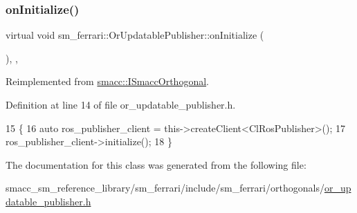 \subsubsection{\texorpdfstring{on\+Initialize()}{onInitialize()}}
{\footnotesize\ttfamily virtual void sm\+\_\+ferrari\+::\+Or\+Updatable\+Publisher\+::on\+Initialize (\begin{DoxyParamCaption}{ }\end{DoxyParamCaption})\hspace{0.3cm}{\ttfamily [inline]}, {\ttfamily [override]}, {\ttfamily [virtual]}}



Reimplemented from \hyperlink{classsmacc_1_1ISmaccOrthogonal_a6bb31c620cb64dd7b8417f8705c79c7a}{smacc\+::\+I\+Smacc\+Orthogonal}.



Definition at line 14 of file or\+\_\+updatable\+\_\+publisher.\+h.


\begin{DoxyCode}
15     \{
16         \textcolor{keyword}{auto} ros\_publisher\_client = this->createClient<ClRosPublisher>();
17         ros\_publisher\_client->initialize();
18     \}
\end{DoxyCode}


The documentation for this class was generated from the following file\+:\begin{DoxyCompactItemize}
\item 
smacc\+\_\+sm\+\_\+reference\+\_\+library/sm\+\_\+ferrari/include/sm\+\_\+ferrari/orthogonals/\hyperlink{sm__ferrari_2include_2sm__ferrari_2orthogonals_2or__updatable__publisher_8h}{or\+\_\+updatable\+\_\+publisher.\+h}\end{DoxyCompactItemize}
